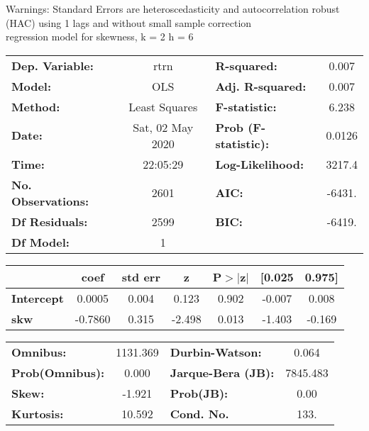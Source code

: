 Warnings: \newline
 [1] Standard Errors are heteroscedasticity and autocorrelation robust (HAC) using 1 lags and without small sample correction\\ 

regression model for skewness, k = 2 h = 6\begin{center}
\begin{tabular}{lclc}
\toprule
\textbf{Dep. Variable:}    &       rtrn       & \textbf{  R-squared:         } &     0.007   \\
\textbf{Model:}            &       OLS        & \textbf{  Adj. R-squared:    } &     0.007   \\
\textbf{Method:}           &  Least Squares   & \textbf{  F-statistic:       } &     6.238   \\
\textbf{Date:}             & Sat, 02 May 2020 & \textbf{  Prob (F-statistic):} &   0.0126    \\
\textbf{Time:}             &     22:05:29     & \textbf{  Log-Likelihood:    } &    3217.4   \\
\textbf{No. Observations:} &        2601      & \textbf{  AIC:               } &    -6431.   \\
\textbf{Df Residuals:}     &        2599      & \textbf{  BIC:               } &    -6419.   \\
\textbf{Df Model:}         &           1      & \textbf{                     } &             \\
\bottomrule
\end{tabular}
\begin{tabular}{lcccccc}
                   & \textbf{coef} & \textbf{std err} & \textbf{z} & \textbf{P$> |$z$|$} & \textbf{[0.025} & \textbf{0.975]}  \\
\midrule
\textbf{Intercept} &       0.0005  &        0.004     &     0.123  &         0.902        &       -0.007    &        0.008     \\
\textbf{skw}       &      -0.7860  &        0.315     &    -2.498  &         0.013        &       -1.403    &       -0.169     \\
\bottomrule
\end{tabular}
\begin{tabular}{lclc}
\textbf{Omnibus:}       & 1131.369 & \textbf{  Durbin-Watson:     } &    0.064  \\
\textbf{Prob(Omnibus):} &   0.000  & \textbf{  Jarque-Bera (JB):  } & 7845.483  \\
\textbf{Skew:}          &  -1.921  & \textbf{  Prob(JB):          } &     0.00  \\
\textbf{Kurtosis:}      &  10.592  & \textbf{  Cond. No.          } &     133.  \\
\bottomrule
\end{tabular}
\end{center}

